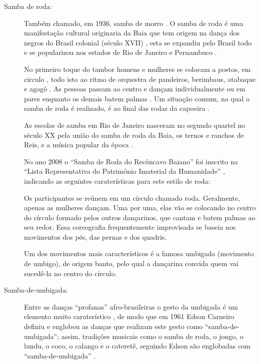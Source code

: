 \begin{description}
\item [Samba de roda:]
\label{ref:Samba-de-roda-danca}
Também chamado, em 1936, samba de morro \cite[pp. 18]{jornalsambaderoda3}.
O samba de roda é uma manifestação cultural originaria da Baia 
que tem origem na dança dos negros do Brasil colonial (século XVII) \cite{unescosambaderoda1} \cite[pp. 21]{brasilpandeiro} \cite{silva2009capoeira},
esta se expandiu pelo Brasil todo e se popularizou nos estados de Rio de Janeiro e Pernambuco \cite{silva2009capoeira}.


No primeiro toque do tambor homens e mulheres se colocam a postos,
em circulo \cite[pp. 21]{brasilpandeiro} \cite{silva2009capoeira},
todo isto ao ritmo de orquestra de pandeiros, berimbaus, atabaque e agogô  \cite{silva2009capoeira}.
As pessoas passam ao centro e dançam individualmente ou em pares enquanto os demais batem palmas \cite[pp. 21]{brasilpandeiro}.
Um situação comum, na qual o samba de roda é realizado, é ao final das rodas da capoeira \cite{silva2009capoeira}.

As escolas de samba em Rio de Janeiro nasceram no segundo quartel no século XX 
pela união do samba de roda da Baia, os ternos e ranchos de Reis,
e a música popular da época \cite[pp. 8]{jornalsambaderoda4}.

No ano 2008 o ``Samba de Roda do Recôncavo Baiano'' foi inscrito na ``Lista Representativa 
do Patrimônio Imaterial da Humanidade'' \cite{unescosambaderoda1}, indicando as seguintes caraterísticas para este estilo de roda:
\begin{citando}
Os participantes se reúnem em um círculo chamado roda. 
Geralmente, apenas as mulheres dançam. 
Uma por uma, elas vão se colocando no centro do círculo formado pelos outros dançarinos, 
que cantam e batem palmas ao seu redor. 
Essa coreografia frequentemente improvisada se baseia nos movimentos dos pés, 
das pernas e dos quadris.

Um dos movimentos mais característicos é a famosa umbigada (movimento de umbigo), 
de origem banto, pelo qual a dançarina convida quem vai sucedê-la no centro do círculo.
\end{citando}
 
%

\item [Samba-de-umbigada:]
\label{ref:samba-de-umbigada}
Entre as danças ``profanas'' %
afro-brasileiras o gesto da umbigada é um elemento muito 
caraterístico \cite[pp. 32]{jornalsambaderoda2} \cite[pp. 85]{sandroni2001feitico},
de modo que em 1961 Edson Carneiro definiu e englobou as danças que realizam este 
gesto como ``samba-de-umbigada''; assim, tradições 
musicais como o samba de roda, o jongo, o lundu, o coco, o calango e o cateretê, 
seguindo Edson são englobadas com  ``samba-de-umbigada'' \cite[pp. 85]{sandroni2001feitico}.


\end{description}

